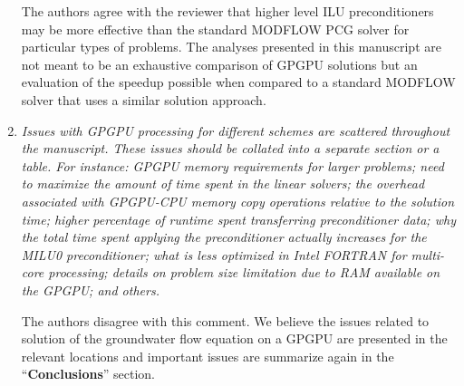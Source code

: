 \documentclass[12pt]{article} %
\begin{document}
\begin{enumerate}
The authors agree with the reviewer that higher level ILU preconditioners may be more effective than the standard MODFLOW PCG solver for particular types of problems. The analyses presented in this manuscript are not meant to be an exhaustive comparison of GPGPU solutions but an evaluation of the speedup possible when compared to a standard MODFLOW solver that uses a similar solution approach.  

\item \textit{Issues with GPGPU processing for different schemes are scattered throughout the man\-uscript. These issues should be collated into a separate section or a table. For instance: GPGPU memory requirements for larger problems; need to maximize the amount of time spent in the linear solvers; the overhead associated with GPGPU-CPU memory copy operations relative to the solution time; higher percentage of runtime spent transferring preconditioner data; why the total time spent applying the preconditioner actually increases for the MILU0 preconditioner; what is less optimized in Intel FORTRAN for multi-core processing; details on problem size limitation due to RAM available on the GPGPU; and others.} 

The authors disagree with this comment. We believe the issues related to solution of the groundwater flow equation on a GPGPU are presented in the relevant locations and important issues are summarize again in the ``\textbf{Conclusions}'' section.

\end{enumerate}
\end{document}
